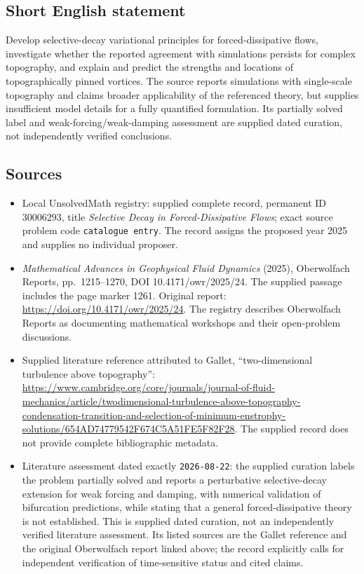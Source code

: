 \documentclass[11pt]{article}
\begin{document}
\subsection{Short English statement}
Develop selective-decay variational principles for forced-dissipative flows, investigate whether the reported agreement with simulations persists for complex topography, and explain and predict the strengths and locations of topographically pinned vortices. The source reports simulations with single-scale topography and claims broader applicability of the referenced theory, but supplies insufficient model details for a fully quantified formulation. Its partially solved label and weak-forcing/weak-damping assessment are supplied dated curation, not independently verified conclusions.
\subsection{Sources}
\begin{itemize}
\item Local UnsolvedMath registry: supplied complete record, permanent ID \(30006293\), title \emph{Selective Decay in Forced-Dissipative Flows}; exact source problem code \texttt{catalogue entry}. The record assigns the proposed year 2025 and supplies no individual proposer.
\item \emph{Mathematical Advances in Geophysical Fluid Dynamics} (2025), Oberwolfach Reports, pp.\ 1215--1270, DOI 10.4171/owr/2025/24. The supplied passage includes the page marker 1261. Original report: \url{https://doi.org/10.4171/owr/2025/24}. The registry describes Oberwolfach Reports as documenting mathematical workshops and their open-problem discussions.
\item Supplied literature reference attributed to Gallet, ``two-dimensional turbulence above topography'': \url{https://www.cambridge.org/core/journals/journal-of-fluid-mechanics/article/twodimensional-turbulence-above-topography-condensation-transition-and-selection-of-minimum-enstrophy-solutions/654AD74779542F674C5A51FE5F82F28}. The supplied record does not provide complete bibliographic metadata.
\item Literature assessment dated exactly \texttt{2026-08-22}: the supplied curation labels the problem partially solved and reports a perturbative selective-decay extension for weak forcing and damping, with numerical validation of bifurcation predictions, while stating that a general forced-dissipative theory is not established. This is supplied dated curation, not an independently verified literature assessment. Its listed sources are the Gallet reference and the original Oberwolfach report linked above; the record explicitly calls for independent verification of time-sensitive status and cited claims.
\end{itemize}
\end{document}
